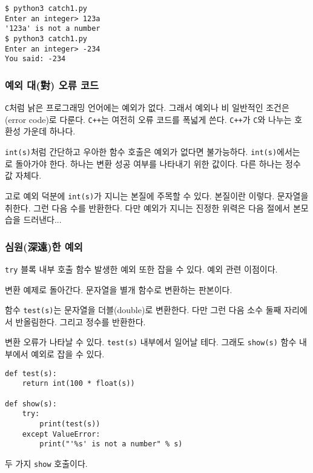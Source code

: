 \documentclass[a4paper]{oblivoir}
\begin{document}
\begin{lstlisting}
$ python3 catch1.py
Enter an integer> 123a
'123a' is not a number
$ python3 catch1.py
Enter an integer> -234
You said: -234
\end{lstlisting}

\subsubsection*{예외 대(對) 오류 코드}

\texttt{C}처럼 낡은 프로그래밍 언어에는 예외가 없다. 그래서 예외나 비 일반적인 조건은 (error code)로 다룬다. \texttt{C++}는 여전히 오류 코드를 폭넓게 쓴다. \texttt{C++}가 \texttt{C}와 나누는 호환성 가운데 하나다.

\texttt{int(s)}처럼 간단하고 우아한 함수 호출은 예외가 없다면 불가능하다. \texttt{int(s)}에서는 로 돌아가야 한다. 하나는 변환 성공 여부를 나타내기 위한  값이다. 다른 하나는 정수 값 자체다.

고로 예외 덕분에 \texttt{int(s)}가 지니는 본질에 주목할 수 있다. 본질이란 이렇다. 문자열을 취한다. 그런 다음 수를 반환한다. 다만 예외가 지니는 진정한 위력은 다음 절에서 본모습을 드러낸다... 

\subsubsection*{심원(深遠)한 예외}

\texttt{try} 블록 내부 호출 함수  발생한 예외 또한 잡을 수 있다. 예외 관련 이점이다.

변환 예제로 돌아간다. 문자열을 별개 함수로 변환하는 판본이다.

함수 \texttt{test(s)}는 문자열을 더블(double)로 변환한다. 다만 그런 다음 소수 둘째 자리에서 반올림한다. 그리고 정수를 반환한다.

변환 오류가 나타날 수 있다. \texttt{test(s)} 내부에서 일어날 테다. 그래도 \texttt{show(s)} 함수 내부에서 예외로 잡을 수 있다.

\begin{verbatim}
def test(s):
    return int(100 * float(s))
    
def show(s):
    try:
        print(test(s))
    except ValueError:
        print("'%s' is not a number" % s)
\end{verbatim}

 두 가지 \texttt{show} 호출이다.
\end{document}
